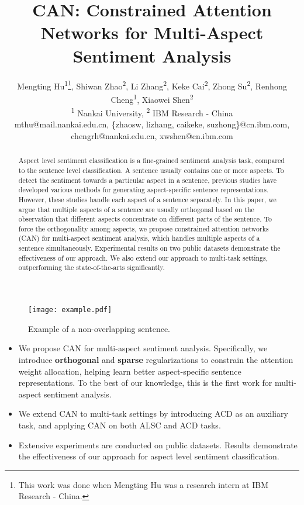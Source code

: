 \documentclass[11pt,a4paper]{article}
\title{CAN: Constrained Attention Networks for Multi-Aspect Sentiment Analysis}
\author{Mengting Hu\textsuperscript{1}\thanks{\quad This work was done when Mengting Hu was a research intern at IBM Research - China.}, Shiwan Zhao\textsuperscript{2}, Li Zhang\textsuperscript{2}, Keke Cai\textsuperscript{2},
Zhong Su\textsuperscript{2}, Renhong Cheng\textsuperscript{1}, Xiaowei Shen\textsuperscript{2} \\
\textsuperscript{1} Nankai University, \textsuperscript{2} IBM Research - China \\
mthu@mail.nankai.edu.cn, \{zhaosw, lizhang, caikeke, suzhong\}@cn.ibm.com, \\ chengrh@nankai.edu.cn, xwshen@cn.ibm.com
}
\begin{document}
\maketitle
\begin{abstract}
Aspect level sentiment classification is a fine-grained sentiment analysis task, compared to the sentence level classification. A sentence usually contains one or more aspects. To detect the sentiment towards a particular aspect in a sentence, previous studies have developed various methods for generating aspect-specific sentence representations. However, these studies handle each aspect of a sentence separately. In this paper, we argue that multiple aspects of a sentence are usually orthogonal based on the observation that different aspects concentrate on different parts of the sentence. To force the orthogonality among aspects, we propose constrained attention networks (CAN) for multi-aspect sentiment analysis, which handles multiple aspects of a sentence simultaneously. Experimental results on two public datasets demonstrate the effectiveness of our approach. We also extend our approach to multi-task settings, outperforming the state-of-the-arts significantly.
\end{abstract}


\begin{figure}
\setlength{\abovecaptionskip}{0.2cm}    %
\setlength{\belowcaptionskip}{-0.2cm}   %
\centering
\texttt{[image: example.pdf]}
\caption{Example of a non-overlapping sentence.} 
  \label{sentence} 
\end{figure}

\begin{itemize}
\vspace{-0.2cm}
\item We propose CAN for multi-aspect sentiment analysis. Specifically, we introduce {\bf orthogonal} and {\bf sparse} regularizations to constrain the attention weight allocation, helping learn better aspect-specific sentence representations. To the best of our knowledge, this is the first work for multi-aspect sentiment analysis.


\vspace{-0.2cm}
\item We extend CAN to multi-task settings by introducing ACD as an auxiliary task, and applying CAN on  both ALSC and ACD tasks. 

\vspace{-0.2cm}
\item Extensive experiments are conducted on public datasets. Results demonstrate the effectiveness of our approach for aspect level sentiment classification.  
\end{itemize}
\end{document}
